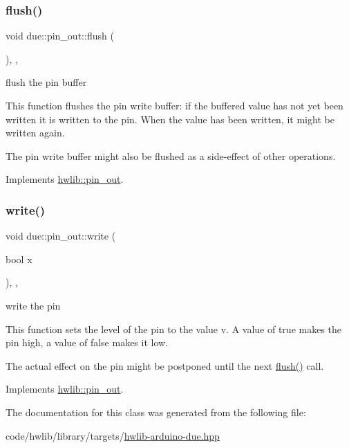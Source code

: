 \subsubsection{\texorpdfstring{flush()}{flush()}}
{\footnotesize\ttfamily void due\+::pin\+\_\+out\+::flush (\begin{DoxyParamCaption}{ }\end{DoxyParamCaption})\hspace{0.3cm}{\ttfamily [inline]}, {\ttfamily [override]}, {\ttfamily [virtual]}}





flush the pin buffer

This function flushes the pin write buffer\+: if the buffered value has not yet been written it is written to the pin. When the value has been written, it might be written again.

The pin write buffer might also be flushed as a side-\/effect of other operations. 

Implements \hyperlink{classhwlib_1_1pin__out_ac22910317477a52431a44e7e3c66fc57}{hwlib\+::pin\+\_\+out}.

\mbox{\label{classdue_1_1pin__out_aa9127ae6a6d0c5f607569d9f67c5fa2b}} 
\subsubsection{\texorpdfstring{write()}{write()}}
{\footnotesize\ttfamily void due\+::pin\+\_\+out\+::write (\begin{DoxyParamCaption}\item[{bool}]{x }\end{DoxyParamCaption})\hspace{0.3cm}{\ttfamily [inline]}, {\ttfamily [override]}, {\ttfamily [virtual]}}





write the pin

This function sets the level of the pin to the value v. A value of true makes the pin high, a value of false makes it low.

The actual effect on the pin might be postponed until the next \hyperlink{classdue_1_1pin__out_a3db1935f691af312853dc2ebe06a56fb}{flush()} call. 

Implements \hyperlink{classhwlib_1_1pin__out_a8d260a70e503dcfb81987c408e170300}{hwlib\+::pin\+\_\+out}.



The documentation for this class was generated from the following file\+:\begin{DoxyCompactItemize}
\item 
code/hwlib/library/targets/\hyperlink{hwlib-arduino-due_8hpp}{hwlib-\/arduino-\/due.\+hpp}\end{DoxyCompactItemize}
